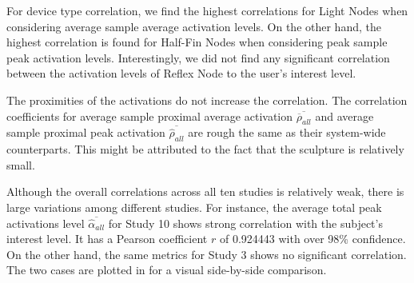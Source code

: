For device type correlation, we find the highest correlations for Light Nodes when considering average sample average activation levels. On the other hand, the highest correlation is found for Half-Fin Nodes when considering peak sample peak activation levels. Interestingly, we did not find any significant correlation between the activation levels of Reflex Node to the user's interest level. 

The proximities of the activations do not increase the correlation. The correlation coefficients for average sample proximal average activation $\overline{\overline{\rho}_{all}}$ and average sample proximal peak activation $\overline{\widehat{\rho}_{all}}$ are rough the same as their system-wide counterparts. This might be attributed to the fact that the sculpture is relatively small. 

Although the overall correlations across all ten studies is relatively weak, there is large variations among different studies. For instance, the average total peak activations level $\overline{\widehat{\alpha}_{all}}$ for Study 10 shows strong correlation with the subject's interest level. It has a Pearson coefficient $r$ of 0.924443 with over 98\% confidence. On the other hand, the same metrics for Study 3 shows no significant correlation. The two cases are plotted in  for a visual side-by-side comparison.


